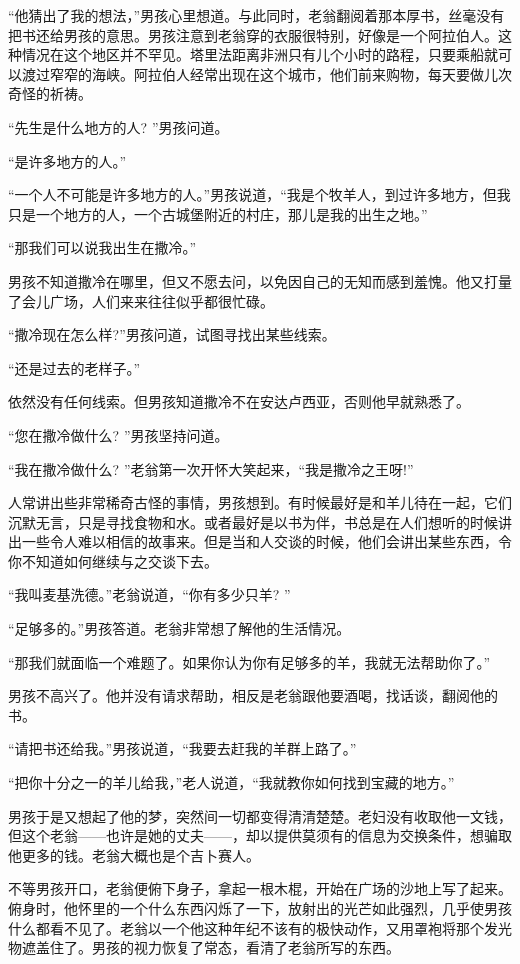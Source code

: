 \documentclass[twoside,openany]{book}
\begin{document}
“他猜出了我的想法，”男孩心里想道。与此同时，老翁翻阅着那本厚书，丝毫没有把书还给男孩的意思。男孩注意到老翁穿的衣服很特别，好像是一个阿拉伯人。这种情况在这个地区并不罕见。塔里法距离非洲只有儿个小时的路程，只要乘船就可以渡过窄窄的海峡。阿拉伯人经常出现在这个城市，他们前来购物，每天要做儿次奇怪的祈祷。

“先生是什么地方的人? ”男孩问道。

“是许多地方的人。”

“一个人不可能是许多地方的人。”男孩说道，“我是个牧羊人，到过许多地方，但我只是一个地方的人，一个古城堡附近的村庄，那儿是我的出生之地。”

“那我们可以说我出生在撒冷。”

男孩不知道撒冷在哪里，但又不愿去问，以免因自己的无知而感到羞愧。他又打量了会儿广场，人们来来往往似乎都很忙碌。

“撒冷现在怎么样?”男孩问道，试图寻找出某些线索。

“还是过去的老样子。”

依然没有任何线索。但男孩知道撒冷不在安达卢西亚，否则他早就熟悉了。

“您在撒冷做什么? ”男孩坚持问道。

“我在撒冷做什么? ”老翁第一次开怀大笑起来，“我是撒冷之王呀!”

人常讲出些非常稀奇古怪的事情，男孩想到。有时候最好是和羊儿待在一起，它们沉默无言，只是寻找食物和水。或者最好是以书为伴，书总是在人们想听的时候讲出一些令人难以相信的故事来。但是当和人交谈的时候，他们会讲出某些东西，令你不知道如何继续与之交谈下去。

“我叫麦基洗德。”老翁说道，“你有多少只羊? ”

“足够多的。”男孩答道。老翁非常想了解他的生活情况。

“那我们就面临一个难题了。如果你认为你有足够多的羊，我就无法帮助你了。”

男孩不高兴了。他并没有请求帮助，相反是老翁跟他要酒喝，找话谈，翻阅他的书。

“请把书还给我。”男孩说道，“我要去赶我的羊群上路了。”

“把你十分之一的羊儿给我，”老人说道，“我就教你如何找到宝藏的地方。”

男孩于是又想起了他的梦，突然间一切都变得清清楚楚。老妇没有收取他一文钱，但这个老翁——也许是她的丈夫——，却以提供莫须有的信息为交换条件，想骗取他更多的钱。老翁大概也是个吉卜赛人。

不等男孩开口，老翁便俯下身子，拿起一根木棍，开始在广场的沙地上写了起来。俯身时，他怀里的一个什么东西闪烁了一下，放射出的光芒如此强烈，几乎使男孩什么都看不见了。老翁以一个他这种年纪不该有的极快动作，又用罩袍将那个发光物遮盖住了。男孩的视力恢复了常态，看清了老翁所写的东西。
\end{document}
